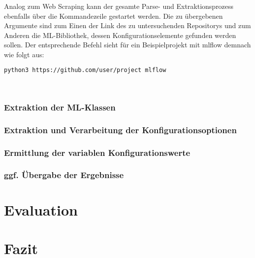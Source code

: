 \documentclass[german,bachelor]{swsLeipzig}
\begin{document}
Analog zum Web Scraping kann der gesamte Parse- und Extraktionsprozess ebenfalls über die Kommandezeile gestartet werden.
Die zu übergebenen Argumente sind zum Einen der Link des zu untersuchenden Repositorys und zum Anderen die ML-Bibliothek, dessen
Konfigurationselemente gefunden werden sollen.
Der entsprechende Befehl sieht für ein Beispielprojekt mit mlflow demnach wie folgt aus: \\

\begin{lstlisting}[language=bash, frame=single, basicstyle=\small]
python3 https://github.com/user/project mlflow
\end{lstlisting}
\

\subsection{Extraktion der ML-Klassen}

\subsection{Extraktion und Verarbeitung der Konfigurationsoptionen}

\subsection{Ermittlung der variablen Konfigurationswerte}

\subsection{ggf. Übergabe der Ergebnisse}

\chapter{Evaluation}\label{Evaluation}

\chapter{Fazit}\label{Fazit}
\end{document}
